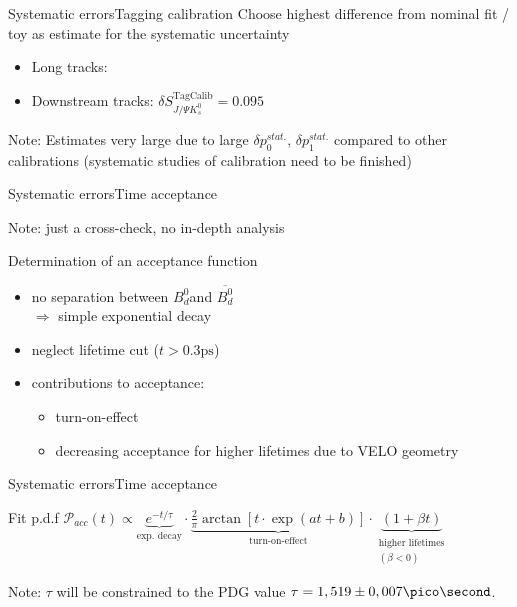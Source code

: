 \documentclass{beamer}
\newcommand{\Bd}{$B_d^0$}
\newcommand{\Bdbar}{$\overline{B_d^0}$}
\newcommand{\SJPsi}{S_{J/\Psi K_s^0}}
\begin{document}
	\begin{frame}{Systematic errors}{Tagging calibration}
	Choose highest difference from nominal fit / toy as estimate for the systematic uncertainty
	\begin{itemize}
	\item Long tracks:
	\item Downstream tracks: $\delta\SJPsi^{\text{TagCalib}} = 0.095$
    \end{itemize}		    
    \begin{alert}{Note:}
    Estimates very large due to large $\delta p_0^{stat.}$, $\delta p_1^{stat.}$ compared to other calibrations (systematic studies of calibration need to be finished)
    \end{alert}
    \end{frame}
    
    \begin{frame}{Systematic errors}{Time acceptance}
    \begin{alert}{Note:}
    just a cross-check, no in-depth analysis
    \end{alert}
    \begin{block}{Determination of an acceptance function}
    \begin{itemize}
    \item no separation between \Bd and \Bdbar \\
          $\Rightarrow$ simple exponential decay
    \item neglect lifetime cut ($t > 0.3\text{ps}$)
    \item contributions to acceptance:
          \begin{itemize}
          \item turn-on-effect
          \item decreasing acceptance for higher lifetimes due to VELO geometry
          \end{itemize}
    \end{itemize}
    \end{block}
\end{frame}

\begin{frame}{Systematic errors}{Time acceptance}
    \begin{block}{Fit p.d.f}
    $\mathcal{P}_{acc}(t) \propto \underbrace{e^{-t/\tau}}_{\text{exp. decay}} \cdot \underbrace{\frac{2}{\pi}\arctan[t\cdot \exp(at+b)]}_{\text{turn-on-effect}} \cdot \underbrace{(1 + \beta t)}_{\substack{\text{higher lifetimes} \\(\beta<0)}}$
    \end{block}
    \begin{alert}{Note:}
    $\tau$ will be constrained to the PDG value $\tau = 1,519 \pm 0,007 \pico\second$.
    \end{alert}
\end{frame}
\end{document}
